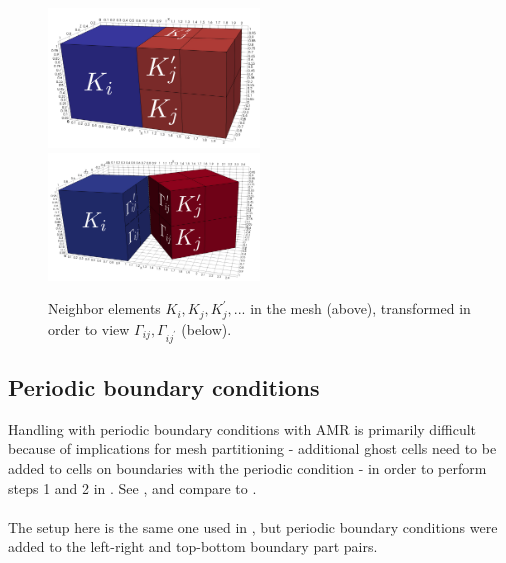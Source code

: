 \begin{figure}[H]
		\begin{center}
			\includegraphics[width=0.5\textwidth]{img/mesh/neighborsOneLargerK.jpg}
			\vspace{3mm}
			\includegraphics[width=0.5\textwidth]{img/mesh/neighborsOneLargerSepK.jpg}
			\vspace{-5mm}
		\caption{Neighbor elements $K_i, K_j, K_j^{'}, ...$ in the mesh (above), transformed in order to view $\Gamma_{ij}, \Gamma_{i{j^{'}}}$ (below).}
		\label{figure:worseNeighbors}
		\end{center}
	\end{figure}\vspace{-5mm}

\subsection{Periodic boundary conditions}
\label{amrPer}
Handling with periodic boundary conditions with AMR is primarily difficult because of implications for mesh partitioning - additional ghost cells need to be added to cells on boundaries with the periodic condition - in order to perform steps 1 and 2 in . See , and compare to .

\paragraph{}
The setup here is the same one used in , but periodic boundary conditions were added to the left-right and top-bottom boundary part pairs.

